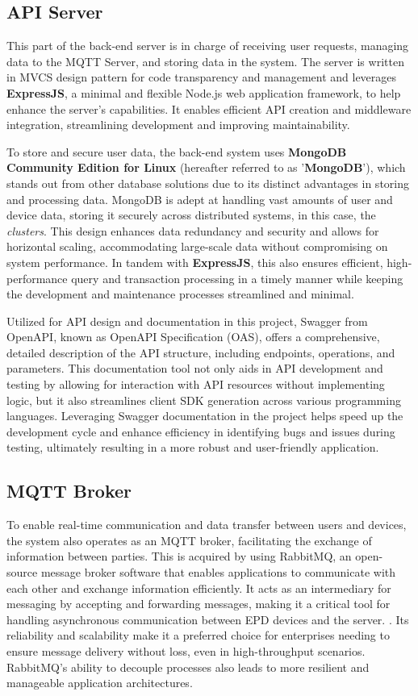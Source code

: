 \documentclass[../Main.tex]{subfiles}
\begin{document}
\subsection{API Server}
This part of the back-end server is in charge of receiving user requests, managing data to the MQTT Server, and storing data in the system. The server is written in MVCS design pattern for code transparency and management and leverages \textbf{ExpressJS}, a minimal and flexible Node.js web application framework, to help enhance the server's capabilities. It enables efficient API creation and middleware integration, streamlining development and improving maintainability.

To store and secure user data, the back-end system uses \textbf{MongoDB Community Edition for Linux} (hereafter referred to as '\textbf{MongoDB}'), which stands out from other database solutions due to its distinct advantages in storing and processing data. MongoDB is adept at handling vast amounts of user and device data, storing it securely across distributed systems, in this case, the \textit{clusters}. This design enhances data redundancy and security and allows for horizontal scaling, accommodating large-scale data without compromising on system performance. In tandem with \textbf{ExpressJS}, this also ensures efficient, high-performance query and transaction processing in a timely manner while keeping the development and maintenance processes streamlined and minimal.

Utilized for API design and documentation in this project, Swagger from OpenAPI, known as OpenAPI Specification (OAS), offers a comprehensive, detailed description of the API structure, including endpoints, operations, and parameters. This documentation tool not only aids in API development and testing by allowing for interaction with API resources without implementing logic, but it also streamlines client SDK generation across various programming languages. Leveraging Swagger documentation in the project helps speed up the development cycle and enhance efficiency in identifying bugs and issues during testing, ultimately resulting in a more robust and user-friendly application.

\subsection{MQTT Broker}
To enable real-time communication and data transfer between users and devices, the system also operates as an MQTT broker, facilitating the exchange of information between parties. This is acquired by using RabbitMQ, an open-source message broker software that enables applications to communicate with each other and exchange information efficiently. It acts as an intermediary for messaging by accepting and forwarding messages, making it a critical tool for handling asynchronous communication between EPD devices and the server. . Its reliability and scalability make it a preferred choice for enterprises needing to ensure message delivery without loss, even in high-throughput scenarios. RabbitMQ's ability to decouple processes also leads to more resilient and manageable application architectures.
\end{document}
